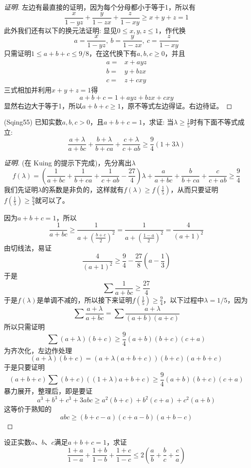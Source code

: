 \exerciseFrom[2017年德国数学奥林匹克试题，\url{http://kuing.orzweb.net/viewthread.php?tid=4578}]

\begin{proof}[证明]
  左边有最直接的证明，因为每个分母都小于等于1，所以有
  \[ \frac{x}{1-yz}+\frac{y}{1-zx}+\frac{z}{1-xy} \geqslant x+y+z = 1 \]
  此外我们还有以下的换元法证明:
  显见$0 \leqslant x,y,z \leqslant 1$，作代换
  \[ a=\frac{x}{1-yz}, \  b=\frac{y}{1-zx}, \  c=\frac{z}{1-xy} \]
  只需证明$1\leqslant a+b+c \leqslant 9/8$，在这代换下有$a,b,c \geqslant 0$，并且
  \begin{align*}
    a = {} & x+ayz \\
    b = {} & y+bzx \\
    c = {} & z+cxy
  \end{align*}
  三式相加并利用$x+y+z=1$得
  \[ a+b+c=1+ayz+bzx+cxy \]
  显然右边大于等于1，所以$a+b+c\geqslant 1$，原不等式左边得证。右边待证。
\end{proof}

\begin{exercise}
  (Sqing55) 已知实数$a,b,c>0$，且$a+b+c=1$，求证: 当$\lambda \geqslant \frac{1}{5}$时有下面不等式成立:
  \[ \frac{a+\lambda}{a+bc} + \frac{b+\lambda}{b+ca} + \frac{c+\lambda}{c+ab} \geqslant \frac{9}{4}(1+3\lambda) \]
  \begin{proof}[证明]
    (在 Kuing 的提示下完成)，先分离出$\lambda$
    \[ f(\lambda) = \left( \frac{1}{a+bc}+\frac{1}{b+ca}+\frac{1}{c+ab}-\frac{27}{4} \right) \lambda + \frac{a}{a+bc}+\frac{b}{b+ca}+\frac{c}{c+ab} \geqslant \frac{9}{4} \]
    我们先证明$\lambda$的系数是非负的，这样就有$f(\lambda)\geqslant f\left( \frac{1}{5} \right)$，从而只要证明$f\left( \frac{1}{5} \right) \geqslant \frac{9}{4}$就可以了。

    因为$a+b+c=1$，所以
    \[ \frac{1}{a+bc} \geqslant \frac{1}{a+\left( \frac{b+c}{2} \right)^2} =
    \frac{1}{a+\left( \frac{1-a}{2} \right)^2} = \frac{4}{(a+1)^2} \]
  由切线法，易证
  \[ \frac{4}{(a+1)^2} \geqslant \frac{9}{4}-\frac{27}{8}\left( a-\frac{1}{3} \right) \]
  于是
  \[ \sum \frac{1}{a+bc} \geqslant \frac{27}{4} \]
  于是$f(\lambda)$是单调不减的，所以接下来证明$f\left( \frac{1}{5} \right) \geqslant \frac{9}{4}$，以下过程中$\lambda=1/5$，因为
  \[ \sum \frac{a+\lambda}{a+bc} = \sum \frac{a+\lambda}{(a+b)(a+c)} \]
  所以只需证明
  \[ \sum (a+\lambda)(b+c) \geqslant \frac{9}{4}(a+b)(b+c)(c+a) \]
  为齐次化，左边作处理
  \[ (a+\lambda)(b+c) = (a+\lambda(a+b+c))(b+c)(a+b+c) \]
  于是只要证明
  \[ (a+b+c)\sum (b+c)((1+\lambda)a+b+c) \geqslant \frac{9}{4}(a+b)(b+c)(c+a) \]
  暴力展开，整理后，即是要证
  \[ a^3+b^3+c^3 +3abc \geqslant a^2(b+c) + b^2(c+a)+c^2(a+b) \]
  这等价于熟知的
  \[ abc \geqslant (b+c-a)(c+a-b)(a+b-c) \]
  \end{proof}
\end{exercise}

\begin{exercise}
  设正实数$a$、$b$、$c$满足$a+b+c=1$，求证
  \[ \frac{1+a}{1-a} + \frac{1+b}{1-b} + \frac{1+c}{1-c} \leqslant 2 \left( \frac{a}{b} + \frac{b}{c} + \frac{c}{a} \right) \]
\end{exercise}



